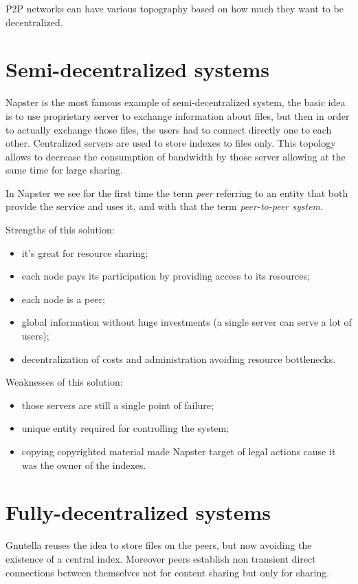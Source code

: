P2P networks can have various topography based on how much they want to be decentralized.

\section{Semi-decentralized systems}
Napster is the most famous example of semi-decentralized system, the basic idea is to use proprietary server to exchange information about files, but then in order to actually exchange those files, the users had to connect directly one to each other.
Centralized servers are used to store indexes to files only.
This topology allows to decrease the consumption of bandwidth by those server allowing at the same time for large sharing.

In Napster we see for the first time the term \emph{peer} referring to an entity that both provide the service and uses it, and with that the term \emph{peer-to-peer system}.

Strengths of this solution:
\begin{itemize}
    \item it's great for resource sharing;
    \item each node pays its participation by providing access to its resources;
    \item each node is a peer;
    \item global information without huge investments (a single server can serve a lot of users);
    \item decentralization of costs and administration avoiding resource bottlenecks.
\end{itemize}

Weaknesses of this solution:
\begin{itemize}
    \item those servers are still a single point of failure;
    \item unique entity required for controlling the system;
    \item copying copyrighted material made Napster target of legal actions cause it was the owner of the indexes.
\end{itemize}

\section{Fully-decentralized systems}
Gnutella reuses the idea to store files on the peers, but now avoiding the existence of a central index.
Moreover peers establish non transient direct connections between themselves not for content sharing but only for sharing.

